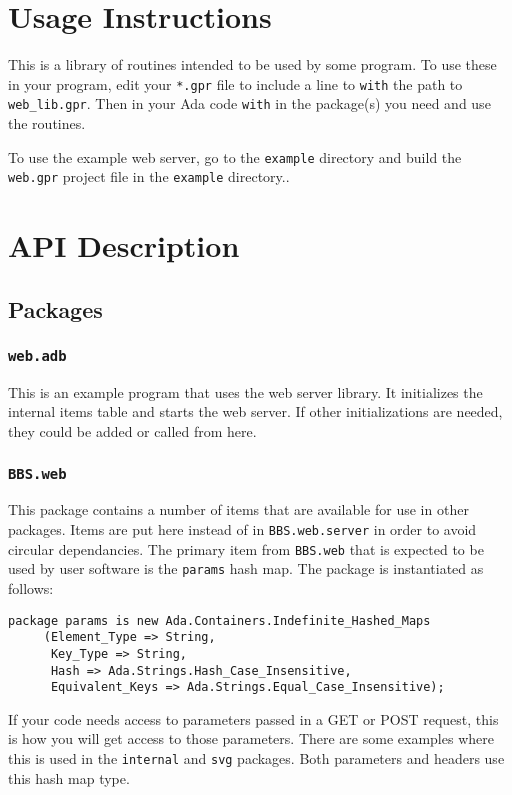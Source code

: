 \documentclass[10pt, openany]{book}
\newcommand{\package}[1]{\texttt{#1}}
\newcommand{\keyword}[1]{\texttt{#1}}
\newcommand{\datatype}[1]{\texttt{#1}}
\newcommand{\filename}[1]{\texttt{#1}}
\begin{document}
\chapter{Usage Instructions}
This is a library of routines intended to be used by some program.  To use these in your program, edit your \filename{*.gpr} file to include a line to \keyword{with} the path to \keyword{web\_lib.gpr}.  Then in your Ada code \keyword{with} in the package(s) you need and use the routines.

To use the example web server, go to the \filename{example} directory and build the \keyword{web.gpr} project file in the \keyword{example} directory..

\chapter{API Description}
\section{Packages}
\subsection{\package{web.adb}}
This is an example program that uses the web server library.  It initializes the internal items table and starts the web server.  If other initializations are needed, they could be added or called from here.

\subsection{\package{BBS.web}}
This package contains a number of items that are available for use in other packages.  Items are put here instead of in \package{BBS.web.server} in order to avoid circular dependancies.  The primary item from \package{BBS.web} that is expected to be used by user software is the \datatype{params} hash map.  The package is instantiated as follows:
\begin{lstlisting}
package params is new Ada.Containers.Indefinite_Hashed_Maps
     (Element_Type => String,
      Key_Type => String,
      Hash => Ada.Strings.Hash_Case_Insensitive,
      Equivalent_Keys => Ada.Strings.Equal_Case_Insensitive);
\end{lstlisting}
If your code needs access to parameters passed in a GET or POST request, this is how you will get access to those parameters.  There are some examples where this is used in the \package{internal} and \package{svg} packages.  Both parameters and headers use this hash map type.
\end{document}
